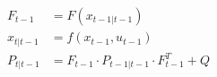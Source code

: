 \begin{align*}
    F_{t-1}     &= F(x_{t-1|t-1})\\
    x_{t|t-1}   &= f(x_{t-1}, u_{t-1})\\
    P_{t | t-1} &= F_{t-1} \cdot P_{t-1|t-1} \cdot F_{t-1}^T + Q\\
\end{align*}
